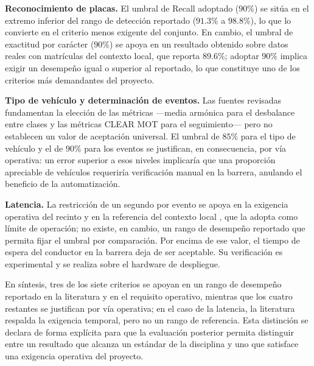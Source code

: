 \textbf{Reconocimiento de placas.} El umbral de Recall adoptado ($90\%$) se sitúa
en el extremo inferior del rango de detección reportado ($91{.}3\%$ a $98{.}8\%$),
lo que lo convierte en el criterio menos exigente del conjunto. En cambio, el
umbral de exactitud por carácter ($90\%$) se apoya en un resultado obtenido sobre
datos reales con matrículas del contexto local, que reporta $89{.}6\%$; adoptar
$90\%$ implica exigir un desempeño igual o superior al reportado, lo que
constituye uno de los criterios más demandantes del proyecto.

\textbf{Tipo de vehículo y determinación de eventos.} Las fuentes revisadas
fundamentan la elección de las métricas ---media armónica para el desbalance
entre clases y las métricas CLEAR MOT para el seguimiento--- pero no establecen
un valor de aceptación universal. El umbral de $85\%$ para el tipo de vehículo y
el de $90\%$ para los eventos se justifican, en consecuencia, por vía operativa:
un error superior a esos niveles implicaría que una proporción apreciable de
vehículos requeriría verificación manual en la barrera, anulando el beneficio de
la automatización.

\textbf{Latencia.} La restricción de un segundo por evento se apoya en la
exigencia operativa del recinto y en la referencia del contexto local
\cite{auzabanegas2026blpr}, que la adopta como límite de operación; no existe, en
cambio, un rango de desempeño reportado que permita fijar el umbral por
comparación. Por encima de ese valor, el tiempo de espera del conductor en la
barrera deja de ser aceptable. Su verificación es experimental y se realiza sobre
el hardware de despliegue.

En síntesis, tres de los siete criterios se apoyan en un rango de desempeño
reportado en la literatura y en el requisito operativo, mientras que los cuatro
restantes se justifican por vía operativa; en el caso de la latencia, la
literatura respalda la exigencia temporal, pero no un rango de referencia. Esta
distinción se declara de forma explícita para que la evaluación posterior permita
distinguir entre un resultado que
alcanza un estándar de la disciplina y uno que satisface una exigencia
operativa del proyecto.

